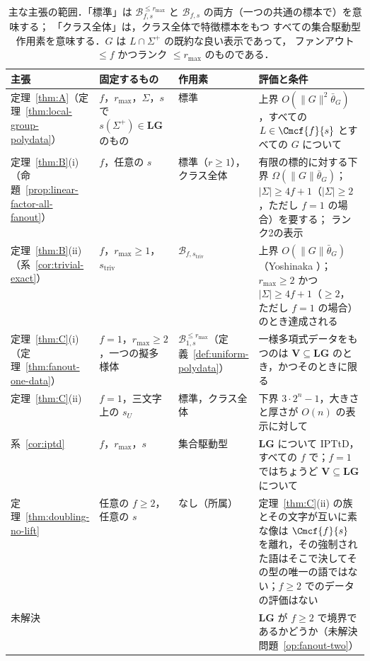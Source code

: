 \begin{table}[htbp]
\caption{主な主張の範囲．「標準」は
$\mathcal B^{\le r_{\max}}_{f,s}$ と $\mathcal B_{f,s}$ の両方（一つの共通の標本で）を意味する；
「クラス全体」は，クラス全体で特徴標本をもつ
すべての集合駆動型作用素を意味する．$G$ は $L\cap\Sigma^+$ の既約な良い表示であって，
ファンアウト $\le f$ かつランク $\le r_{\max}$ のものである．}
\label{tab:scope}
\centering
\footnotesize
\setlength{\tabcolsep}{3pt}
\renewcommand{\arraystretch}{1.15}
\begin{tabularx}{\linewidth}{@{}>{\raggedright\arraybackslash}p{0.2\linewidth}>{\raggedright\arraybackslash}p{0.22\linewidth}>{\raggedright\arraybackslash}p{0.17\linewidth}>{\raggedright\arraybackslash}X@{}}
\hline
主張 & 固定するもの & 作用素 & 評価と条件\\
\hline
定理~\ref{thm:A}（定理~\ref{thm:local-group-polydata}）
 & $f$，$r_{\max}$，$\Sigma$，$s$ で $s(\Sigma^+)\in\mathbf{LG}$ のもの
 & 標準
 & 上界 $O(\|G\|^2\bar\theta_G)$，すべての $L\in\Cmcf{f}{s}$ とすべての $G$ について\\
定理~\ref{thm:B}(i)（命題~\ref{prop:linear-factor-all-fanout}）
 & $f$，任意の $s$
 & 標準（$r\ge1$），クラス全体
 & 有限の標的に対する下界 $\Omega(\|G\|\bar\theta_G)$；$|\Sigma|\ge4f+1$（$|\Sigma|\ge2$，ただし $f=1$ の場合）を要する；
   ランク2の表示\\
定理~\ref{thm:B}(ii)（系~\ref{cor:trivial-exact}）
 & $f$，$r_{\max}\ge1$，$s_{\mathrm{triv}}$
 & $\mathcal B_{f,s_{\mathrm{triv}}}$
 & 上界 $O(\|G\|\bar\theta_G)$（Yoshinaka \cite{Yoshinaka2011}）；$r_{\max}\ge2$ かつ $|\Sigma|\ge4f+1$（$\ge2$，ただし $f=1$ の場合）のとき達成される\\
定理~\ref{thm:C}(i)（定理~\ref{thm:fanout-one-data}）
 & $f=1$，$r_{\max}\ge2$，一つの擬多様体
 & $\mathcal B^{\le r_{\max}}_{1,s}$（定義~\ref{def:uniform-polydata}）
 & 一様多項式データをもつのは $\mathbf V\subseteq\mathbf{LG}$ のとき，かつそのときに限る\\
定理~\ref{thm:C}(ii)
  & $f=1$，三文字上の $s_U$
 & 標準，クラス全体
 & 下界 $3\cdot2^n-1$，大きさと厚さが $O(n)$ の表示に対して\\
系~\ref{cor:iptd}
 & $f$，$r_{\max}$，$s$
 & 集合駆動型
 & $\mathbf{LG}$ について IPTtD，すべての $f$ で；$f=1$ ではちょうど $\mathbf{V}\subseteq\mathbf{LG}$ について\\
定理~\ref{thm:doubling-no-lift}
 & 任意の $f\ge2$，任意の $s$
 & なし（所属）
  & 定理~\ref{thm:C}(ii) の族とその文字が互いに素な像は $\Cmcf{f}{s}$ を離れ，その強制された語はそこで決してその型の唯一の語ではない；$f\ge2$ でのデータの評価はない\\
未解決
 & 
 & 
 & $\mathbf{LG}$ が $f\ge2$ で境界であるかどうか（未解決問題~\ref{op:fanout-two}）\\
\hline
\end{tabularx}
\end{table}


